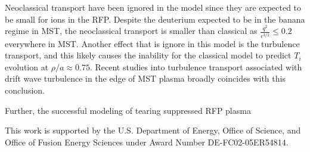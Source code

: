 \documentclass[aip, pop, preprint]{revtex4-1}
\begin{document}


Neoclassical transport have been ignored in the model since they are expected
to be small for ions in the RFP. Despite the deuterium expected to be in the
banana regime\cite{Kumar2012a} in MST, the neoclassical transport is smaller
than classical as $\frac{q^2}{\epsilon^{3/2}} \leq 0.2$ everywhere in MST.
Another effect that is ignore in this model is the turbulence transport, and
this likely causes the inability for the classical model to predict $T_i$
evolution at $\rho /a \approx 0.75$. Recent studies into turbulence transport
associated with drift wave turbulence in the edge of MST plasma broadly
coincides with this conclusion\cite{NishizawaPRLSubmitted}.

Further, the successful modeling of tearing suppressed RFP plasma  

This work is supported by the U.S. Department of Energy, Office of Science, and
Office of Fusion Energy Sciences under Award Number DE-FC02-05ER54814.



%
%
\end{document}
